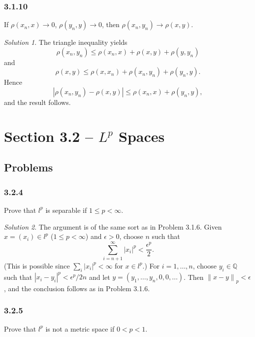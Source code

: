 \documentclass{report}
\newcommand{\bb}[1]{\mathbb{#1}}
\newcommand{\norm}[1]{{\lVert #1 \rVert}}
\theoremstyle{remark}
\newtheorem*{solution}{Solution}
\begin{document}
\subsubsection*{3.1.10}
If $\rho(x_n, x) \to 0$, $\rho(y_n, y) \to 0$, then $\rho(x_n, y_n) \to \rho(x,y)$.

\begin{solution}
  The triangle inequality yields
  \begin{equation*}
    \rho(x_n,y_n) \le \rho(x_n, x) + \rho(x, y) + \rho(y, y_n)
  \end{equation*}
  and
  \begin{equation*}
    \rho(x,y) \le \rho(x, x_n) + \rho(x_n, y_n) + \rho(y_n, y).
  \end{equation*}
  Hence
  \begin{equation*}
    |\rho(x_n, y_n) - \rho(x,y)| \le \rho(x_n, x) + \rho(y_n, y),
  \end{equation*}
  and the result follows.
\end{solution}

\section*{Section 3.2 -- $L^p$ Spaces}

\subsection*{Problems}

\subsubsection*{3.2.4}
Prove that $l^p$ is separable if $1 \le p < \infty$.

\begin{solution}
  The argument is of the same sort as in Problem 3.1.6. Given $x = (x_i) \in l^p$ ($1 \le p < \infty$) and $\epsilon > 0$, choose $n$ such that
  \begin{equation*}
    \sum_{i=n+1}^\infty |x_i|^p < \frac{\epsilon^p}{2}.
  \end{equation*}
  (This is possible since $\sum_i |x_i|^p < \infty$ for $x \in l^p$.) For $i = 1, \dots, n$, choose $y_i \in \bb Q$ such that $|x_i - y_i|^p < \epsilon^p / 2n$ and let $y = (y_1, \dots, y_n, 0, 0, \dots)$. Then $\norm{x-y}_p < \epsilon$, and the conclusion follows as in Problem 3.1.6.
\end{solution}

\subsubsection*{3.2.5}
Prove that $l^p$ is not a metric space if $0 < p < 1$.
\end{document}
